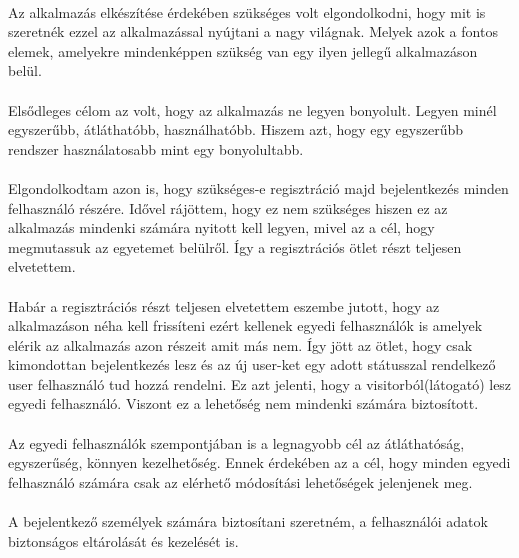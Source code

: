 	\paragraph{}
	Az alkalmazás elkészítése érdekében szükséges volt elgondolkodni, hogy mit is szeretnék ezzel az alkalmazással nyújtani a nagy világnak. Melyek azok a fontos elemek, amelyekre mindenképpen szükség van egy ilyen jellegű alkalmazáson belül.
	\paragraph{}
	Elsődleges célom az volt, hogy az alkalmazás ne legyen bonyolult. Legyen minél egyszerűbb, átláthatóbb, használhatóbb. Hiszem azt, hogy egy egyszerűbb rendszer használatosabb mint egy bonyolultabb.
	\paragraph{}
	Elgondolkodtam azon is, hogy szükséges-e regisztráció majd bejelentkezés minden felhasználó részére. Idővel rájöttem, hogy ez nem szükséges hiszen ez az alkalmazás mindenki számára nyitott kell legyen, mivel az a cél, hogy megmutassuk az egyetemet belülről. Így a regisztrációs ötlet részt teljesen elvetettem.
	\paragraph{}
	Habár a regisztrációs részt teljesen elvetettem eszembe jutott, hogy az alkalmazáson néha kell frissíteni ezért kellenek egyedi felhasználók is amelyek elérik az alkalmazás azon részeit amit más nem. Így jött az ötlet, hogy csak kimondottan bejelentkezés lesz és az új user-ket egy adott státusszal rendelkező user felhasználó tud hozzá rendelni. Ez azt jelenti, hogy a visitorból(látogató) lesz egyedi felhasználó. Viszont ez a lehetőség nem mindenki számára biztosított.
	\paragraph{}
	Az egyedi felhasználók szempontjában is a legnagyobb cél az átláthatóság, egyszerűség, könnyen kezelhetőség. Ennek érdekében az a cél, hogy minden egyedi felhasználó számára csak az elérhető módosítási lehetőségek jelenjenek meg. 
	\paragraph{}
	A bejelentkező személyek számára biztosítani szeretném, a felhasználói adatok biztonságos eltárolását és kezelését is.
